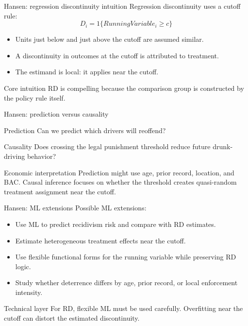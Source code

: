 \documentclass[aspectratio=169,11pt]{beamer}
\newcommand{\core}[1]{\begin{block}{Core intuition}#1\end{block}}
\newcommand{\grad}[1]{\begin{alertblock}{Technical layer}#1\end{alertblock}}
\newcommand{\econ}[1]{\begin{exampleblock}{Economic interpretation}#1\end{exampleblock}}
\begin{document}
\begin{frame}{Hansen: regression discontinuity intuition}
Regression discontinuity uses a cutoff rule:
\[
D_i = 1\{RunningVariable_i \geq c\}
\]
\begin{itemize}
  \item Units just below and just above the cutoff are assumed similar.
  \item A discontinuity in outcomes at the cutoff is attributed to treatment.
  \item The estimand is local: it applies near the cutoff.
\end{itemize}
\core{
RD is compelling because the comparison group is constructed by the policy rule itself.
}
\end{frame}

\begin{frame}{Hansen: prediction versus causality}
\begin{block}{Prediction}
Can we predict which drivers will reoffend?
\end{block}
\begin{alertblock}{Causality}
Does crossing the legal punishment threshold reduce future drunk-driving behavior?
\end{alertblock}
\econ{
Prediction might use age, prior record, location, and BAC. Causal inference focuses on whether the threshold creates quasi-random treatment assignment near the cutoff.
}
\end{frame}

\begin{frame}{Hansen: ML extensions}
Possible ML extensions:
\begin{itemize}
  \item Use ML to predict recidivism risk and compare with RD estimates.
  \item Estimate heterogeneous treatment effects near the cutoff.
  \item Use flexible functional forms for the running variable while preserving RD logic.
  \item Study whether deterrence differs by age, prior record, or local enforcement intensity.
\end{itemize}
\grad{
For RD, flexible ML must be used carefully. Overfitting near the cutoff can distort the estimated discontinuity.
}
\end{frame}
\end{document}
